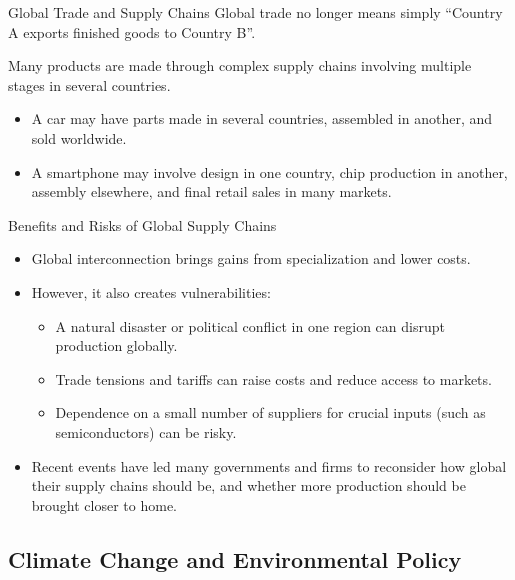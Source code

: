 \documentclass[aspectratio=169]{beamer}
\begin{document}
\begin{frame}{Global Trade and Supply Chains}
  \transfade
  Global trade no longer means simply ``Country A exports finished goods to Country B''.

  \vspace{0.2cm}
  Many products are made through complex supply chains involving multiple stages in several
  countries.

  \begin{itemize}[<+->]
    \item A car may have parts made in several countries, assembled in another, and sold worldwide.
    \item A smartphone may involve design in one country, chip production in another, assembly
    elsewhere, and final retail sales in many markets.
  \end{itemize}
\end{frame}

\begin{frame}{Benefits and Risks of Global Supply Chains}
  \transfade
  \begin{itemize}[<+->]
    \item Global interconnection brings gains from specialization and lower costs.
    \item However, it also creates vulnerabilities:
          \begin{itemize}[<+->]
            \item A natural disaster or political conflict in one region can disrupt production globally.
            \item Trade tensions and tariffs can raise costs and reduce access to markets.
            \item Dependence on a small number of suppliers for crucial inputs (such as semiconductors)
            can be risky.
          \end{itemize}
    \item Recent events have led many governments and firms to reconsider how global their
    supply chains should be, and whether more production should be brought closer to home.
  \end{itemize}
\end{frame}

\subsection{Climate Change and Environmental Policy}
\end{document}
